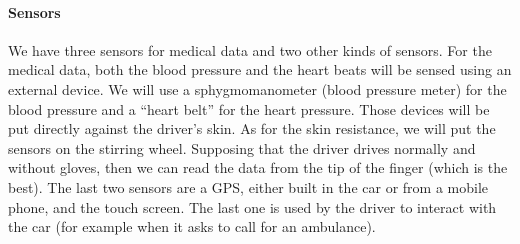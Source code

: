 \documentclass[a4paper]{article}
\begin{document}
\paragraph{Sensors} We have three sensors for medical data and two other kinds of sensors. For the medical data, both the blood pressure and the heart beats will be sensed using an external device. We will use a sphygmomanometer (blood pressure meter) for the blood pressure and a “heart belt” for the heart pressure. Those devices will be put directly against the driver’s skin. As for the skin resistance, we will put the sensors on the stirring wheel. Supposing that the driver drives normally and without gloves, then we can read the data from the tip of the finger (which is the best). The last two sensors are a GPS, either built in the car or from a mobile phone, and the touch screen. The last one is used by the driver to interact with the car (for example when it asks to call for an ambulance).
\end{document}
